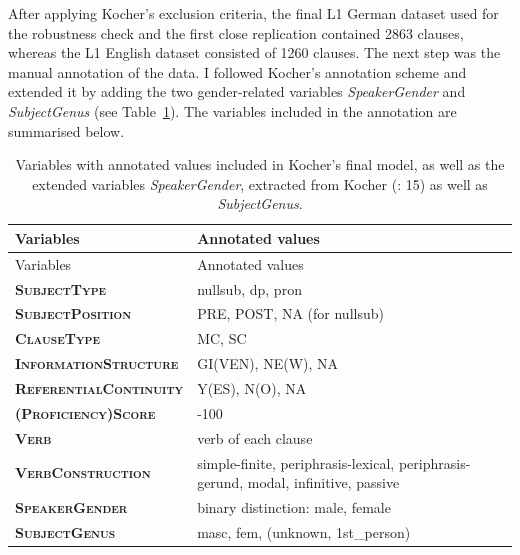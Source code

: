 \documentclass[
  letterpaper,
  DIV=11,
  numbers=noendperiod]{scrartcl}
\begin{document}
After applying Kocher's exclusion criteria, the final L1 German dataset
used for the robustness check and the first close replication contained
2863 clauses, whereas the L1 English dataset consisted of 1260 clauses.
The next step was the manual annotation of the data. I followed Kocher's
annotation scheme and extended it by adding the two gender-related
variables \emph{SpeakerGender} and \emph{SubjectGenus} (see
Table~\ref{tbl-variables}). The variables included in the annotation are
summarised below.

\begin{longtable}[]{@{}
  >{\raggedright\arraybackslash}p{}
  >{\raggedright\arraybackslash}p{}@{}}
\caption{Variables with annotated values included in Kocher's final
model, as well as the extended variables \emph{SpeakerGender}, extracted
from Kocher (: 15) as well as
\emph{SubjectGenus}.}\label{tbl-variables}\tabularnewline
\toprule\noalign{}
\begin{minipage}[b]{\linewidth}\raggedright
Variables
\end{minipage} & \begin{minipage}[b]{\linewidth}\raggedright
Annotated values
\end{minipage} \\
\midrule\noalign{}
\endfirsthead
\toprule\noalign{}
\begin{minipage}[b]{\linewidth}\raggedright
Variables
\end{minipage} & \begin{minipage}[b]{\linewidth}\raggedright
Annotated values
\end{minipage} \\
\midrule\noalign{}
\endhead
\bottomrule\noalign{}
\endlastfoot
\textsc{\textbf{SubjectType}} & nullsub, dp, pron \\
\textsc{\textbf{SubjectPosition}} & PRE, POST, NA (for nullsub) \\
\textsc{\textbf{ClauseType}} & MC, SC \\
\textsc{\textbf{InformationStructure}} & GI(VEN), NE(W), NA \\
\textsc{\textbf{ReferentialContinuity}} & Y(ES), N(O), NA \\
\textsc{\textbf{(Proficiency)Score}} & 0-100 \\
\textsc{\textbf{Verb}} & verb of each clause \\
\textsc{\textbf{VerbConstruction}} & simple-finite, periphrasis-lexical,
periphrasis-gerund, modal, infinitive, passive \\
\textsc{\textbf{SpeakerGender}} & binary distinction: male, female \\
\textsc{\textbf{SubjectGenus}} & masc, fem, (unknown, 1st\_person) \\
\end{longtable}
\end{document}

